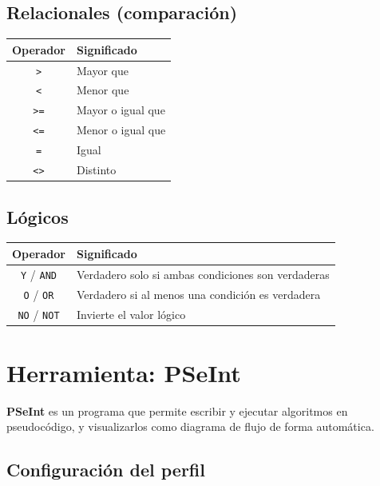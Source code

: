 \subsection{Relacionales (comparación)}

\begin{table}[H]
\centering
\begin{tabular}{cl}
\toprule
Operador & Significado \\
\midrule
\texttt{>} & Mayor que \\
\texttt{<} & Menor que \\
\texttt{>=} & Mayor o igual que \\
\texttt{<=} & Menor o igual que \\
\texttt{=} & Igual \\
\texttt{<>} & Distinto \\
\bottomrule
\end{tabular}
\end{table}

\subsection{Lógicos}

\begin{table}[H]
\centering
\begin{tabular}{cp{9cm}}
\toprule
Operador & Significado \\
\midrule
\texttt{Y} / \texttt{AND} & Verdadero solo si ambas condiciones son verdaderas \\
\texttt{O} / \texttt{OR} & Verdadero si al menos una condición es verdadera \\
\texttt{NO} / \texttt{NOT} & Invierte el valor lógico \\
\bottomrule
\end{tabular}
\end{table}

\section{Herramienta: PSeInt}

\textbf{PSeInt} es un programa que permite escribir y ejecutar algoritmos en pseudocódigo, y visualizarlos como diagrama de flujo de forma automática.

\subsection{Configuración del perfil}


